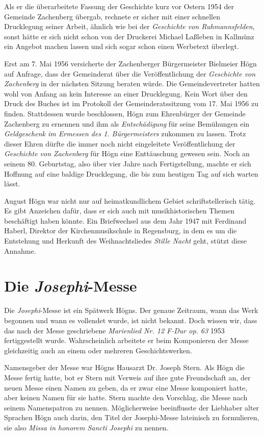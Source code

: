 \documentclass{book}
\newcommand{\zitat}[1]{\textit{#1}}
\begin{document}
Als er die überarbeitete Fassung der Geschichte kurz vor Ostern 1954 der
Gemeinde Zachenberg übergab, rechnete er sicher mit einer schnellen
Drucklegung seiner Arbeit, ähnlich wie bei der \textit{Geschichte von
Ruhmannsfelden}, sonst hätte er sich nicht schon von der Druckerei
Michael Laßleben in Kallmünz ein Angebot machen lassen und sich sogar
schon einen Werbetext überlegt.

Erst am 7. Mai 1956 versicherte der Zachenberger Bürgermeister Bielmeier
Högn auf Anfrage, dass der Gemeinderat über die Veröffentlichung der
\textit{Geschichte von Zachenberg} in der nächsten Sitzung beraten
würde. Die Gemeindevertreter hatten wohl von Anfang an kein Interesse
an einer Drucklegung. Kein Wort über den Druck des Buches ist im
Protokoll der Gemeinderatssitzung vom 17. Mai 1956 zu finden.
Stattdessen wurde beschlossen, Högn zum Ehrenbürger der Gemeinde
Zachenberg zu ernennen und ihm als \zitat{Entschädigung
}für seine Bemühungen ein \zitat{Geldgeschenk im Ermessen des
1. Bürgermeisters} zukommen zu lassen. Trotz dieser Ehren dürfte die
immer noch nicht eingeleitete Veröffentlichung der \textit{Geschichte
von Zachenberg} für Högn eine Enttäuschung gewesen sein. Noch an
seinem 80. Geburtstag, also über vier Jahre nach Fertigstellung, machte
er sich Hoffnung auf eine baldige Drucklegung, die bis zum heutigen Tag
auf sich warten lässt.

August Högn war nicht nur auf heimatkundlichem Gebiet schriftstellerisch
tätig. Es gibt Anzeichen dafür, dass er sich auch mit musikhistorischen
Themen beschäftigt haben könnte. Ein Briefwechsel aus dem Jahr 1947
mit Ferdinand Haberl, Direktor der Kirchenmusikschule in Regensburg,
in dem es um die Entstehung und Herkunft des Weihnachtsliedes
\textit{Stille Nacht} geht, stützt diese Annahme.

\section{Die \textit{Josephi}{}-Messe}

Die \textit{Josephi}{}-Messe ist ein Spätwerk Högns. Der genaue
Zeitraum, wann das Werk begonnen und wann es vollendet wurde, ist nicht
bekannt. Doch wissen wir, dass das nach der Messe geschriebene
\textit{Marienlied Nr. 12 F-Dur op. 63} 1953 fertiggestellt wurde.
Wahrscheinlich arbeitete er beim Komponieren der Messe gleichzeitig
auch an einem oder mehreren Geschichtswerken.

Namensgeber der Messe war Högns Hausarzt Dr. Joseph Stern. Als Högn die
Messe fertig hatte, bot er Stern mit Verweis auf ihre gute Freundschaft
an, der neuen Messe einen Namen zu geben, da er zwar eine Messe
komponiert hatte, aber keinen Namen für sie hatte. Stern machte den
Vorschlag, die Messe nach seinem Namenspatron zu nennen. Möglicherweise
beeinflusste der Liebhaber alter Sprachen Högn auch darin, den Titel
der Josephi-Messe lateinisch zu formulieren, sie also \textit{Missa in
honorem Sancti Josephi} zu nennen.
\end{document}
